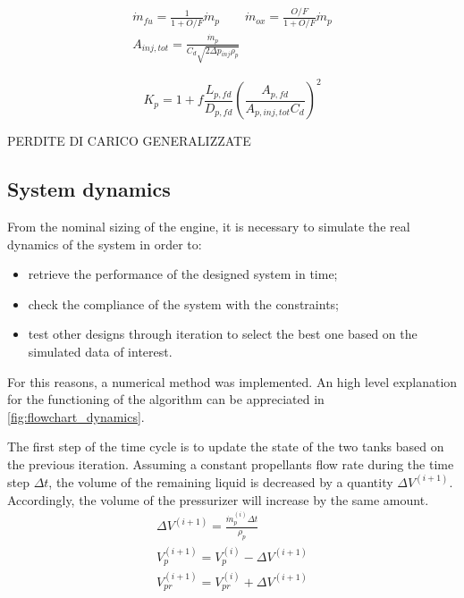 \begin{gather}
    \dot{m}_{fu} = \frac{1}{1 + O/F}\dot{m}_p \qquad \dot{m}_{ox} = \frac{O/F}{1 + O/F}\dot{m}_p
    \\
    A_{inj,tot} = \frac{\dot{m}_p}{C_d \sqrt{2\Delta p_{inj} \rho_p}} 
\end{gather}
   
\begin{equation}
    K_{p} = 1 + f \frac{L_{p,fd}}{D_{p,fd}} \left(\frac{A_{p, fd}}{A_{p,inj, tot}C_d}\right)^2
\end{equation}

PERDITE DI CARICO GENERALIZZATE
 
\subsection{System dynamics}
\label{subsec:dynamics}

From the nominal sizing of the engine, it is necessary to simulate the real dynamics of the system in order to:

\begin{itemize}
    \item retrieve the performance of the designed system in time;
    \item check the compliance of the system with the constraints;
    \item test other designs through iteration to select the best one based on the simulated data of interest.
\end{itemize}

For this reasons, a numerical method was implemented. An high level explanation for the functioning of the algorithm can be appreciated in \autoref{fig:flowchart_dynamics}.


The first step of the time cycle is to update the state of the two tanks based on the previous iteration. Assuming a constant propellants flow rate during the time step $\Delta t$, the volume of the remaining liquid is decreased by a quantity $\Delta V ^ {(i+1)}$. Accordingly, the volume of the pressurizer will increase by the same amount.
\begin{gather}
    \Delta V ^ {(i+1)} = \frac{\dot{m}_p^{(i)} \Delta t}{\rho_p} \\
    V_p ^ {(i+1)} = V_p ^ {(i)} - \Delta V ^ {(i+1)} \\
    V_{pr} ^ {(i+1)} = V_{pr} ^ {(i)} + \Delta V ^ {(i+1)}
\end{gather}

